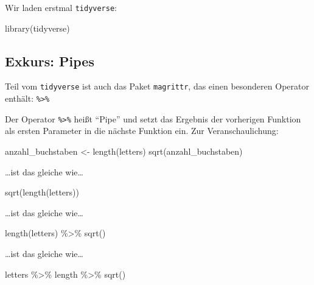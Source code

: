 \documentclass[11pt,german,a4paper]{article}
\newenvironment{Shaded}{\begin{snugshade}}{\end{snugshade}}
\newcommand{\FunctionTok}[1]{\textcolor[rgb]{0.00,0.00,0.00}{#1}}
\newcommand{\NormalTok}[1]{#1}
\newcommand{\OtherTok}[1]{\textcolor[rgb]{0.56,0.35,0.01}{#1}}
\newcommand{\SpecialCharTok}[1]{\textcolor[rgb]{0.00,0.00,0.00}{#1}}
\begin{document}
Wir laden erstmal \texttt{tidyverse}:

\begin{Shaded}
\begin{Highlighting}[]
\FunctionTok{library}\NormalTok{(tidyverse)}
\end{Highlighting}
\end{Shaded}

\hypertarget{exkurs-pipes}{%
\subsection{Exkurs: Pipes}\label{exkurs-pipes}}

Teil vom \texttt{tidyverse} ist auch das Paket \texttt{magrittr}, das einen besonderen Operator enthält: \texttt{\%\textgreater{}\%}

Der Operator \texttt{\%\textgreater{}\%} heißt ``Pipe'' und setzt das Ergebnis der vorherigen Funktion als ersten Parameter in die nächste Funktion ein. Zur Veranschaulichung:

\begin{Shaded}
\begin{Highlighting}[]
\NormalTok{anzahl\_buchstaben }\OtherTok{\textless{}{-}} \FunctionTok{length}\NormalTok{(letters)}
\FunctionTok{sqrt}\NormalTok{(anzahl\_buchstaben)}
\end{Highlighting}
\end{Shaded}

\ldots ist das gleiche wie\ldots{}

\begin{Shaded}
\begin{Highlighting}[]
\FunctionTok{sqrt}\NormalTok{(}\FunctionTok{length}\NormalTok{(letters))}
\end{Highlighting}
\end{Shaded}

\ldots ist das gleiche wie\ldots{}

\begin{Shaded}
\begin{Highlighting}[]
\FunctionTok{length}\NormalTok{(letters) }\SpecialCharTok{\%\textgreater{}\%}
  \FunctionTok{sqrt}\NormalTok{()}
\end{Highlighting}
\end{Shaded}

\ldots ist das gleiche wie\ldots{}

\begin{Shaded}
\begin{Highlighting}[]
\NormalTok{letters }\SpecialCharTok{\%\textgreater{}\%}
\NormalTok{  length }\SpecialCharTok{\%\textgreater{}\%}
  \FunctionTok{sqrt}\NormalTok{()}
\end{Highlighting}
\end{Shaded}
\end{document}
